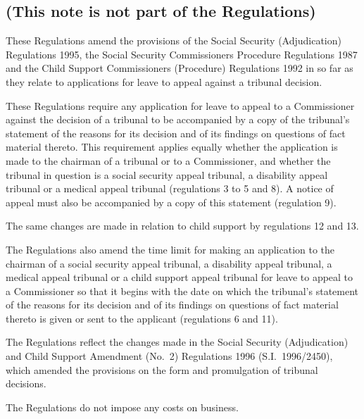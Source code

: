 \documentclass[12pt,a4paper]{article}
\begin{document}
\renewcommand\parthead{--- Explanatory Note}

\subsection*{(This note is not part of the Regulations)}

These Regulations amend the provisions of the Social Security (Adjudication) Regulations 1995, the Social Security Commissioners Procedure Regulations 1987 and the Child Support Commissioners (Procedure) Regulations 1992 in so far as they relate to applications for leave to appeal against a tribunal decision.

  These Regulations require any application for leave to appeal to a Commissioner against the decision of a tribunal to be accompanied by a copy of the tribunal’s statement of the reasons for its decision and of its findings on questions of fact material thereto. This requirement applies equally whether the application is made to the chairman of a tribunal or to a Commissioner, and whether the tribunal in question is a social security appeal tribunal, a disability appeal tribunal or a medical appeal tribunal (regulations 3 to 5 and 8). A notice of appeal must also be accompanied by a copy of this statement (regulation 9).

  The same changes are made in relation to child support by regulations 12 and 13.

  The Regulations also amend the time limit for making an application to the chairman of a social security appeal tribunal, a disability appeal tribunal, a medical appeal tribunal or a child support appeal tribunal for leave to appeal to a Commissioner so that it begins with the date on which the tribunal’s statement of the reasons for its decision and of its findings on questions of fact material thereto is given or sent to the applicant (regulations 6 and 11).

  The Regulations reflect the changes made in the Social Security (Adjudication) and Child Support Amendment (No.\ 2) Regulations 1996 (S.I.\ 1996/2450), which amended the provisions on the form and promulgation of tribunal decisions.

  The Regulations do not impose any costs on business.
\end{document}
